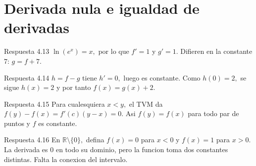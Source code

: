 \documentclass[10pt,a4paper,oneside,openany]{book}
\begin{document}
\section{Derivada nula e igualdad de derivadas}
\begin{PSevenAnswerFixed}{Respuesta 4.13}
\(\ln(e^x)=x,\) por lo que \(f'=1\) y \(g'=1\). Difieren en la constante \(7\): \(g=f+7\).
\end{PSevenAnswerFixed}
\begin{PSevenAnswerFixed}{Respuesta 4.14}
\(h=f-g\) tiene \(h'=0,\) luego es constante. Como \(h(0)=2,\) se sigue \(h(x)=2\) y por tanto \(f(x)=g(x)+2\).
\end{PSevenAnswerFixed}
\begin{PSevenAnswerFixed}{Respuesta 4.15}
Para cualesquiera \(x<y,\) el TVM da \(f(y)-f(x)=f'(c)(y-x)=0\). Asi \(f(y)=f(x)\) para todo par de puntos y \(f\) es constante.
\end{PSevenAnswerFixed}
\begin{PSevenAnswerFixed}{Respuesta 4.16}
En \(\mathbb{R}\setminus \{0\},\) defina \(f(x)=0\) para \(x<0\) y \(f(x)=1\) para \(x>0\). La derivada es \(0\) en todo su dominio, pero la funcion toma dos constantes distintas. Falta la conexion del intervalo.
\end{PSevenAnswerFixed}
\end{document}
